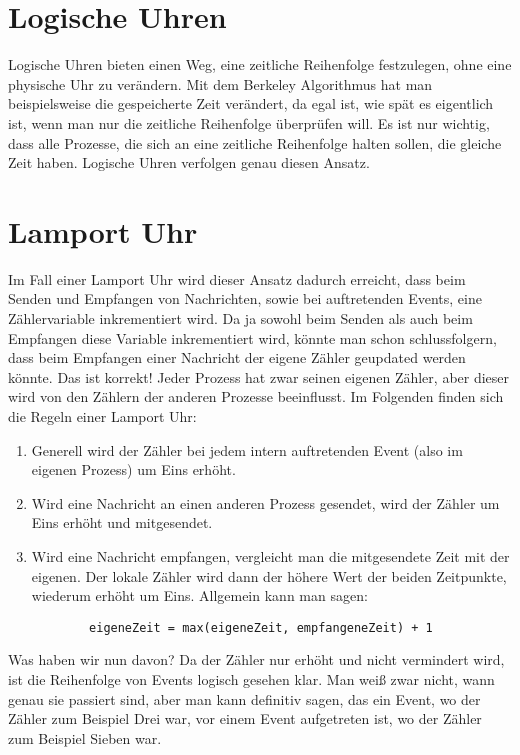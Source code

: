 \documentclass[a4paper,11pt]{report}
\begin{document}
\section{Logische Uhren}
Logische Uhren bieten einen Weg, eine zeitliche Reihenfolge festzulegen, ohne eine physische Uhr zu verändern. Mit dem Berkeley Algorithmus hat man beispielsweise die gespeicherte Zeit verändert, da egal ist, wie spät es eigentlich ist, wenn man nur die zeitliche Reihenfolge überprüfen will. Es ist nur wichtig, dass alle Prozesse, die sich an eine zeitliche Reihenfolge halten sollen, die gleiche Zeit haben. Logische Uhren verfolgen genau diesen Ansatz.

\section{Lamport Uhr}
Im Fall einer Lamport Uhr wird dieser Ansatz dadurch erreicht, dass beim Senden und Empfangen von Nachrichten, sowie bei auftretenden Events, eine Zählervariable inkrementiert wird. Da ja sowohl beim Senden als auch beim Empfangen diese Variable inkrementiert wird, könnte man schon schlussfolgern, dass beim Empfangen einer Nachricht der eigene Zähler geupdated werden könnte. Das ist korrekt! Jeder Prozess hat zwar seinen eigenen Zähler, aber dieser wird von den Zählern der anderen Prozesse beeinflusst. Im Folgenden finden sich die Regeln einer Lamport Uhr:
\begin{enumerate}
	\item Generell wird der Zähler bei jedem intern auftretenden Event (also im eigenen Prozess) um Eins erhöht.
	\item Wird eine Nachricht an einen anderen Prozess gesendet, wird der Zähler um Eins erhöht und mitgesendet.
	\item Wird eine Nachricht empfangen, vergleicht man die mitgesendete Zeit mit der eigenen. Der lokale Zähler wird dann der höhere Wert der beiden Zeitpunkte, wiederum erhöht um Eins. Allgemein kann man sagen:
	\begin{verbatim}
		eigeneZeit = max(eigeneZeit, empfangeneZeit) + 1
	\end{verbatim}
\end{enumerate}
Was haben wir nun davon? Da der Zähler nur erhöht und nicht vermindert wird, ist die Reihenfolge von Events logisch gesehen klar. Man weiß zwar nicht, wann genau sie passiert sind, aber man kann definitiv sagen, das ein Event, wo der Zähler zum Beispiel Drei war, vor einem Event aufgetreten ist, wo der Zähler zum Beispiel Sieben war.\\
\end{document}
